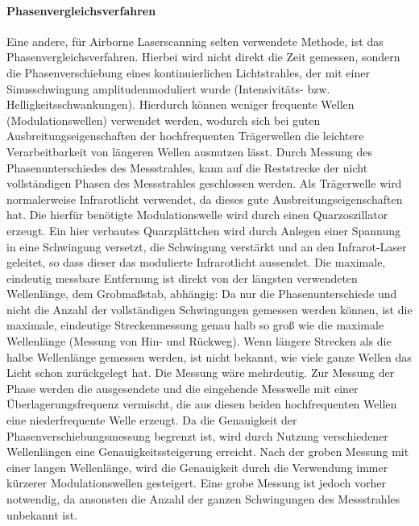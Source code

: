 \documentclass[a4paper,12pt,bibliography=totoc, listof=totoc,titlepage,pointlessnumbers]{scrreprt}
\begin{document}
\paragraph{Phasenvergleichsverfahren}
Eine andere, für Airborne Laser\-scan\-ning selten verwendete Methode, ist das Phasenvergleichsverfahren. Hierbei wird nicht direkt die Zeit gemessen, sondern die Phasenverschiebung eines kontinuierlichen Lichtstrahles, der mit einer Sinusschwingung amplitudenmoduliert wurde (Intensivitäts- bzw. Helligkeitsschwankungen). Hierdurch können weniger frequente Wellen (Modulationswellen) verwendet werden, wodurch sich bei guten Ausbreitungseigenschaften der hochfrequenten Trägerwellen die leichtere Verarbeitbarkeit von längeren Wellen ausnutzen lässt. Durch Messung des Phasenunterschiedes des Messstrahles, kann auf die Reststrecke der nicht vollständigen Phasen des Messstrahles geschlossen werden. Als Trägerwelle wird normalerweise Infrarotlicht verwendet, da dieses gute Ausbreitungseigenschaften hat. Die hierfür benötigte Modulationswelle wird durch einen Quarzoszillator erzeugt. Ein hier verbautes Quarzplättchen wird durch Anlegen einer Spannung in eine Schwingung versetzt, die Schwingung verstärkt und an den Infrarot-Laser geleitet, so dass dieser das modulierte Infrarotlicht aussendet. Die maximale, eindeutig messbare Entfernung ist direkt von der längsten verwendeten Wellenlänge, dem Grobmaßstab, abhängig: Da nur die Phasenunterschiede und nicht die Anzahl der vollständigen Schwingungen gemessen werden können, ist die maximale, eindeutige Streckenmessung genau halb so groß wie die maximale Wellenlänge (Messung von Hin- und Rückweg). Wenn längere Strecken als die halbe Wellenlänge gemessen werden, ist nicht bekannt, wie viele ganze Wellen das Licht schon zurückgelegt hat. Die Messung wäre mehrdeutig. Zur Messung der Phase werden die ausgesendete und die eingehende Messwelle mit einer Überlagerungsfrequenz vermischt, die aus diesen beiden hochfrequenten Wellen eine niederfrequente Welle erzeugt. Da die Genauigkeit der Phasenverschiebungsmessung begrenzt ist, wird durch Nutzung verschiedener Wellenlängen eine Genauigkeitssteigerung erreicht. Nach der groben Messung mit einer langen Wellenlänge, wird die Genauigkeit durch die Verwendung immer kürzerer Modulationswellen gesteigert. Eine grobe Messung ist jedoch vorher notwendig, da ansonsten die Anzahl der ganzen Schwingungen des Messstrahles unbekannt ist. \citep[S. 311ff]{Witte2006}
\end{document}

